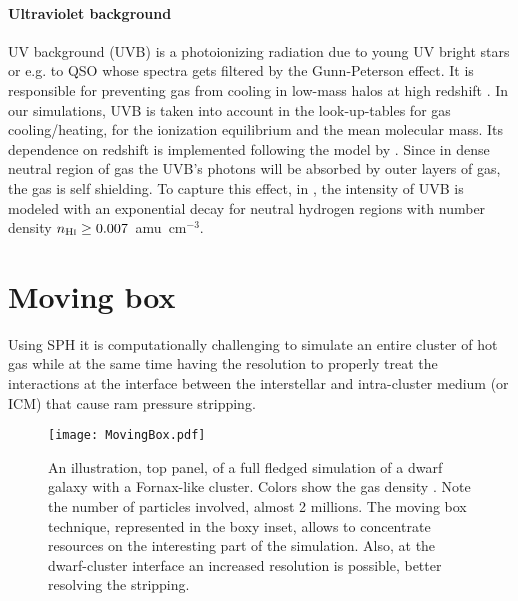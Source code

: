 \paragraph{Ultraviolet background}
UV background (UVB) is a photoionizing radiation due to young UV bright stars or e.g. to QSO whose spectra gets filtered by the Gunn-Peterson effect. It is responsible for preventing gas from cooling in low-mass halos at high redshift \citep{Efstathiou1992, Navarro1997}.
In our simulations, UVB is taken into account in the look-up-tables for gas cooling/heating, for the ionization equilibrium and the mean molecular mass. Its dependence on redshift is implemented following the model by \citet{Faucher-Giguere2009}.
Since in dense neutral region of gas the UVB's photons will be absorbed by outer layers of gas, the gas is self shielding. To capture this effect, in \citet{DeRijcke2013}, the intensity of UVB is modeled with an exponential decay for neutral hydrogen regions with number density $n_{\text{H}\textsc i} \geq 0.007$~amu~cm$^{-3}$.


\section{Moving box}

Using SPH it is computationally challenging to simulate an entire cluster of hot gas while at the same time having the resolution to properly treat the interactions at the interface between the interstellar and intra-cluster medium (or ICM) that cause ram pressure stripping.

\begin{figure}[h]
 \centering
 \texttt{[image: MovingBox.pdf]}
 \caption{An illustration, top panel, of a full fledged simulation of a dwarf galaxy with a Fornax-like cluster. 
 Colors show the gas density \citep[using the \texttt{glnemo2} software][]{Lambert2012}.
 Note the number of particles involved, almost 2 millions.
 The moving box technique, represented in the boxy inset, allows to concentrate resources on the interesting part of the simulation.
 Also, at the dwarf-cluster interface an increased resolution is possible, better resolving the stripping.}
 \label{fig:MovingBox}
\end{figure}

